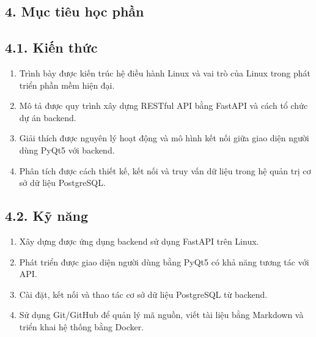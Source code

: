 \subsection*{4. Mục tiêu học phần}

\subsection*{4.1. Kiến thức}
\begin{enumerate}[label=4.1.\arabic*.]
    \item Trình bày được kiến trúc hệ điều hành Linux và vai trò của Linux trong phát triển phần mềm hiện đại.
    \item Mô tả được quy trình xây dựng RESTful API bằng FastAPI và cách tổ chức dự án backend.
    \item Giải thích được nguyên lý hoạt động và mô hình kết nối giữa giao diện người dùng PyQt5 với backend.
    \item Phân tích được cách thiết kế, kết nối và truy vấn dữ liệu trong hệ quản trị cơ sở dữ liệu PostgreSQL.
\end{enumerate}

\subsection*{4.2. Kỹ năng}
\begin{enumerate}[label=4.2.\arabic*.]
    \item Xây dựng được ứng dụng backend sử dụng FastAPI trên Linux.
    \item Phát triển được giao diện người dùng bằng PyQt5 có khả năng tương tác với API.
    \item Cài đặt, kết nối và thao tác cơ sở dữ liệu PostgreSQL từ backend.
    \item Sử dụng Git/GitHub để quản lý mã nguồn, viết tài liệu bằng Markdown và triển khai hệ thống bằng Docker.
\end{enumerate}